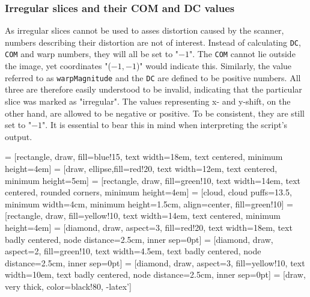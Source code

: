 \subsubsection{Irregular slices and their COM and DC values}
As irregular slices cannot be used to asses distortion caused by the scanner, numbers describing their distortion are not of interest.
Instead of calculating \texttt{DC}, \texttt{COM} and warp numbers, they will all be set to "$-1$".
The \texttt{COM} cannot lie outside the image, yet coordinates "($-1,-1$)" would indicate this.
Similarly, the value referred to as \texttt{warpMagnitude} and the \texttt{DC} are defined to be positive numbers.
All three are therefore easily understood to be invalid, indicating that the particular slice was marked as "irregular".
The values representing x- and y-shift, on the other hand, are allowed to be negative or positive.
To be consistent, they are still set to "$-1$".
It is essential to bear this in mind when interpreting the script's output.

 = [rectangle, draw, fill=blue!15, text width=18em, text centered, minimum height=4em]
 = [draw, ellipse,fill=red!20, text width=12em, text centered, minimum height=5em]
 = [rectangle, draw, fill=green!10, text width=14em, text centered, rounded corners, minimum height=4em]
 = [cloud, cloud puffs=13.5, minimum width=4cm, minimum height=1.5cm, align=center, fill=green!10]
 = [rectangle, draw, fill=yellow!10, text width=14em, text centered, minimum height=4em]
 = [diamond, draw, aspect=3, fill=red!20, text width=18em, text badly centered, node distance=2.5cm, inner sep=0pt]
 = [diamond, draw, aspect=2, fill=green!10, text width=4.5em, text badly centered, node distance=2.5cm, inner sep=0pt]
 = [diamond, draw, aspect=3, fill=yellow!10, text width=10em, text badly centered, node distance=2.5cm, inner sep=0pt]
 = [draw, very thick, color=black!80, -latex']

